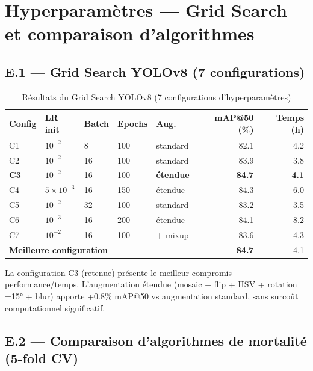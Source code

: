 \chapter{Hyperparamètres — Grid Search et comparaison d'algorithmes}
\label{ann:hyperparams}

\section*{E.1 — Grid Search YOLOv8 (7 configurations)}

\begin{table}[H]
\centering
\caption{Résultats du Grid Search YOLOv8 (7 configurations d'hyperparamètres)}
\label{tab:gs_yolo}
\begin{tabular}{lllllrr}
\toprule
\textbf{Config} & \textbf{LR init} & \textbf{Batch} & \textbf{Epochs} & \textbf{Aug.} & \textbf{mAP@50 (\%)} & \textbf{Temps (h)} \\
\midrule
C1 & $10^{-2}$ & 8  & 100 & standard   & 82.1 & 4.2 \\
C2 & $10^{-2}$ & 16 & 100 & standard   & 83.9 & 3.8 \\
\textbf{C3} & $10^{-2}$ & 16 & 100 & \textbf{étendue} & \textbf{84.7} & \textbf{4.1} \\
C4 & $5\times10^{-3}$ & 16 & 150 & étendue & 84.3 & 6.0 \\
C5 & $10^{-2}$ & 32 & 100 & standard   & 83.2 & 3.5 \\
C6 & $10^{-3}$ & 16 & 200 & étendue    & 84.1 & 8.2 \\
C7 & $10^{-2}$ & 16 & 100 & + mixup    & 83.6 & 4.3 \\
\midrule
\multicolumn{5}{l}{\textbf{Meilleure configuration}} & \textbf{84.7} & 4.1 \\
\bottomrule
\end{tabular}
\end{table}

La configuration C3 (retenue) présente le meilleur compromis performance/temps.
L'augmentation étendue (mosaic + flip + HSV + rotation ±15° + blur) apporte
+0.8\% mAP@50 vs augmentation standard, sans surcoût computationnel significatif.

\section*{E.2 — Comparaison d'algorithmes de mortalité (5-fold CV)}


